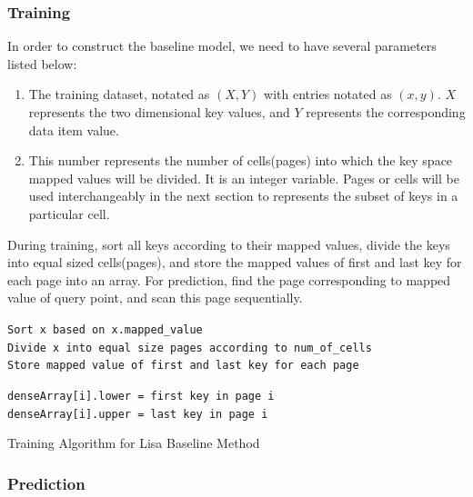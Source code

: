 \subsubsection{Training}

In order to construct the baseline model, we need to have several parameters listed below:
\begin{enumerate}
	\item The training dataset, notated as $(X, Y)$ with entries notated as $(x,y)$. $X$ represents the two dimensional key values, and $Y$ represents the corresponding data item value. 
	\item This number represents the number of cells(pages) into which the key space mapped values will be divided. It is an integer variable. Pages or cells will be used interchangeably in the next section to represents the subset of keys in a particular cell. 
\end{enumerate}

During training, sort all keys according to their mapped values, divide the keys into equal sized cells(pages), and store the mapped values of first and last key for each page into an array. For prediction, find the page corresponding to mapped value of query point, and scan this page sequentially. 

\begin{algorithm}[H]
    \SetAlgoLined
     \texttt{Sort x based on x.mapped\_value}\\
     \texttt{Divide x into equal size pages according to num\_of\_cells}\\
     \texttt{Store mapped value of first and last key for each page }\\
     {
         \texttt{denseArray[i].lower = first key in page i  } \\
		 \texttt{denseArray[i].upper = last key in page i  }
		
     }
     \caption{Training Algorithm for Lisa Baseline Method}
     \label{Training_Lisa_Baseline}
\end{algorithm}

\subsubsection{Prediction}

